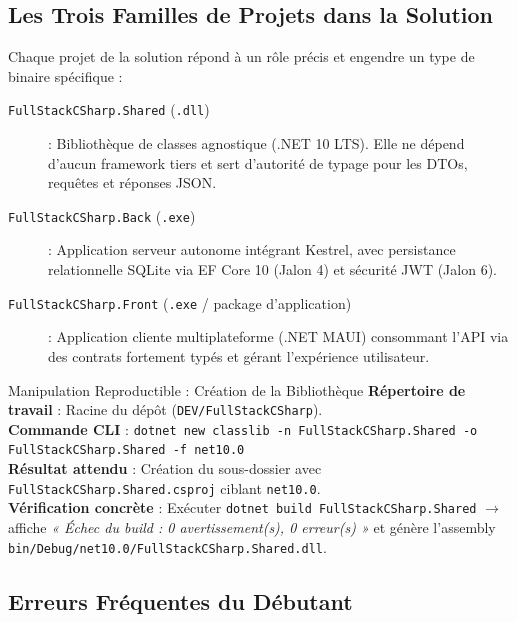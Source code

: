 \newpage

\subsection*{Les Trois Familles de Projets dans la Solution}

Chaque projet de la solution répond à un rôle précis et engendre un type de binaire spécifique :

\begin{description}
    \item[\color{cyanproj!90!black}\texttt{FullStackCSharp.Shared} (\texttt{.dll})] : Bibliothèque de classes agnostique (.NET 10 LTS). Elle ne dépend d'aucun framework tiers et sert d'autorité de typage pour les DTOs, requêtes et réponses JSON.
    \item[\color{secondary}\texttt{FullStackCSharp.Back} (\texttt{.exe})] : Application serveur autonome intégrant Kestrel, avec persistance relationnelle SQLite via EF Core 10 (Jalon 4) et sécurité JWT (Jalon 6).
    \item[\color{indigo}\texttt{FullStackCSharp.Front} (\texttt{.exe} / package d'application)] : Application cliente multiplateforme (.NET MAUI) consommant l'API via des contrats fortement typés et gérant l'expérience utilisateur.
\end{description}

\vspace{0.3cm}

\begin{bestpracticebox}{Manipulation Reproductible : Création de la Bibliothèque}
\textbf{Répertoire de travail} : Racine du dépôt (\texttt{DEV/FullStackCSharp}).\\[2pt]
\textbf{Commande CLI} : \texttt{dotnet new classlib -n FullStackCSharp.Shared -o FullStackCSharp.Shared -f net10.0}\\[2pt]
\textbf{Résultat attendu} : Création du sous-dossier avec \texttt{FullStackCSharp.Shared.csproj} ciblant \texttt{net10.0}.\\[2pt]
\textbf{Vérification concrète} : Exécuter \texttt{dotnet build FullStackCSharp.Shared} $\longrightarrow$ affiche \textit{« Échec du build : 0 avertissement(s), 0 erreur(s) »} et génère l'assembly \texttt{bin/Debug/net10.0/FullStackCSharp.Shared.dll}.
\end{bestpracticebox}

\vspace{0.2cm}

\subsection*{Erreurs Fréquentes du Débutant}

